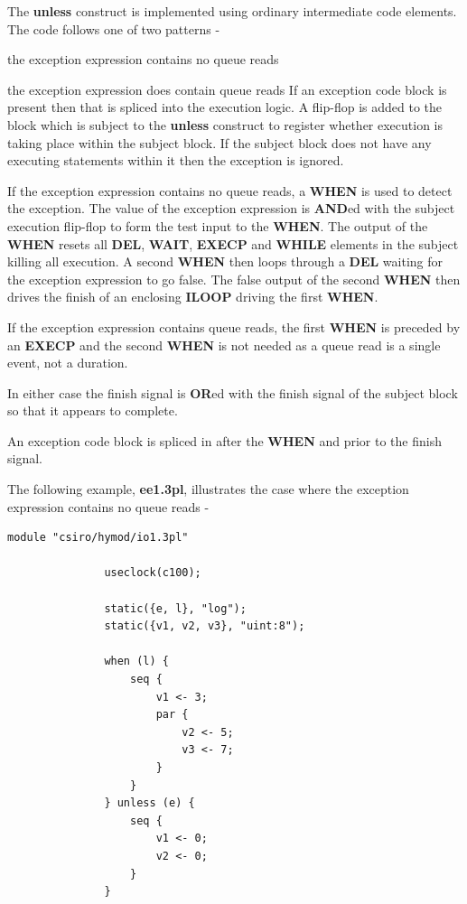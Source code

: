             The {\bf unless} construct is implemented using ordinary intermediate
            code elements. The code follows one of two patterns -
            \blist
            \item   the exception expression contains no queue reads
            \item   the exception expression does contain queue reads
            \blend
            If an exception code block is present then that is spliced
            into the execution logic. A flip-flop is added to the block
            which is subject to the {\bf unless} construct to register
            whether execution is taking place within the subject block.
            If the subject block does not have any executing statements within
            it then the exception is ignored.
            
            If the exception expression contains no queue reads, a {\bf WHEN} is
            used to detect the exception. The value of the exception expression
            is {\bf AND}ed with the subject execution flip-flop to form the test
            input to the {\bf WHEN}. The output of the {\bf WHEN} resets all
            {\bf DEL}, {\bf WAIT}, {\bf EXECP} and {\bf WHILE} elements in the
            subject killing all execution. A second {\bf WHEN} then loops
            through a {\bf DEL} waiting for the exception expression to go
            false. The false output of the second {\bf WHEN} then drives the
            finish of an enclosing {\bf ILOOP} driving the first {\bf WHEN}.
            
            If the exception expression contains queue reads, the first {\bf
            WHEN} is preceded by an {\bf EXECP} and the second {\bf WHEN} is not
            needed as a queue read is a single event, not a duration.

            In either case the finish signal is {\bf OR}ed with the finish
            signal of the subject block so that it appears to complete.

            An exception code block is spliced in after the {\bf WHEN} and prior
            to the finish signal.

            The following example, {\bf ee1.3pl}, illustrates the case where the
            exception expression contains no queue reads -

            \begin{lstlisting}[gobble=12, language=threepl]
               module "csiro/hymod/io1.3pl"

               useclock(c100);

               static({e, l}, "log");
               static({v1, v2, v3}, "uint:8");

               when (l) {
                   seq {
                       v1 <- 3;
                       par {
                           v2 <- 5;
                           v3 <- 7;
                       }
                   }
               } unless (e) {
                   seq {
                       v1 <- 0;
                       v2 <- 0;
                   }
               }
            \end{lstlisting}
            
